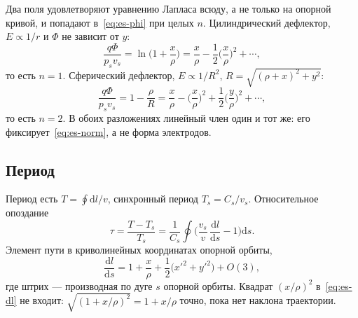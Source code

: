 Два поля удовлетворяют уравнению Лапласа всюду, а не только на опорной кривой, и попадают в~\eqref{eq:es-phi} при целых $n$. Цилиндрический дефлектор, $E\propto 1/r$ и $\Phi$ не зависит от $y$:
\begin{equation}
\label{eq:es-cyl}
\frac{q\Phi}{p_s v_s}=\ln\Biggl(1+\frac{x}{\rho}\Biggr)
=\frac{x}{\rho}-\frac12\Biggl(\frac{x}{\rho}\Biggr)^2+\cdots,
\end{equation}
то есть $n=1$. Сферический дефлектор, $E\propto 1/R^2$, $R=\sqrt{(\rho+x)^2+y^2}$:
\begin{equation}
\label{eq:es-sph}
\frac{q\Phi}{p_s v_s}=1-\frac{\rho}{R}
=\frac{x}{\rho}-\Biggl(\frac{x}{\rho}\Biggr)^2+\frac12\Biggl(\frac{y}{\rho}\Biggr)^2+\cdots,
\end{equation}
то есть $n=2$. В обоих разложениях линейный член один и тот же: его фиксирует~\eqref{eq:es-norm}, а не форма электродов.

\subsection{Период}
\label{sec:es-tau}

Период есть $T=\oint\mathrm{d}l/v$, синхронный период $T_s=C_s/v_s$. Относительное опоздание
\begin{equation}
\label{eq:es-tau}
\tau=\frac{T-T_s}{T_s}
=\frac{1}{C_s}\oint\Biggl(\frac{v_s}{v}\,\frac{\mathrm{d}l}{\mathrm{d}s}-1\Biggr)\mathrm{d}s.
\end{equation}
Элемент пути в криволинейных координатах опорной орбиты,
\begin{equation}
\label{eq:es-dl}
\frac{\mathrm{d}l}{\mathrm{d}s}
=1+\frac{x}{\rho}+\frac12\bigl(x'^2+y'^2\bigr)+O(3),
\end{equation}
где штрих --- производная по дуге $s$ опорной орбиты. Квадрат $(x/\rho)^2$ в~\eqref{eq:es-dl} не входит: $\sqrt{(1+x/\rho)^2}=1+x/\rho$ точно, пока нет наклона траектории.

